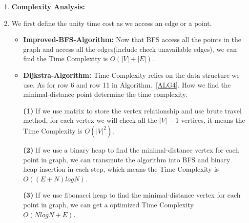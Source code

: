 \documentclass[12pt,a4paper]{article}
\makeatletter
\newtheorem*{solution}{Solution}
\theoremstyle{definition}
\renewenvironment{solution}[1][Solution] {\par\pushQED{\qed}\normalfont\topsep6\p@\@plus6\p@\relax\trivlist\item[\hskip\labelsep\bfseries#1\@addpunct{.}]\ignorespaces}{\popQED\endtrivlist\@endpefalse} \makeatother
\makeatother
\begin{document}
\begin{enumerate}
\begin{solution}
        \textbf{Complexity Analysis:}\item
        We first define the unity time cost as we access an edge or a point.
        \begin{itemize}
        \item \textbf{Improved-BFS-Algorithm:} Now that BFS access all the points in the graph and access all the edges(include check unavailable edges), we can find the Time Complexity is $O(|V| + |E|)$.
        \item \textbf{Dijkstra-Algorithm:} Time Complexity relies on the data structure we use. As for row 6 and row 11 in Algorithm.~\ref{ALG4}. How we find the minimal-distance point determine the time complexity.\par
        \textbf{(1)} If we use matrix to store the vertex relationship and use brute travel method, for each vertex we will check all the $|V|-1$ vertices, it means the Time Complexity is $O(|V|^2)$.
        \par
        \textbf{(2)} If we use a binary heap to find the minimal-distance vertex for each point in graph, we can transmute the algorithm into BFS and binary heap insertion in each step, which means the Time Complexity is $O((E+N)logN)$.
        \par
        \textbf{(3)} If we use fibonacci heap to find the minimal-distance vertex for each point in graph, we can get a optimized Time Complexity  $O(NlogN+E)$.
        \par
        \end{itemize}

    \end{solution}


    

\end{enumerate}

\vspace{20pt}

\end{document}
